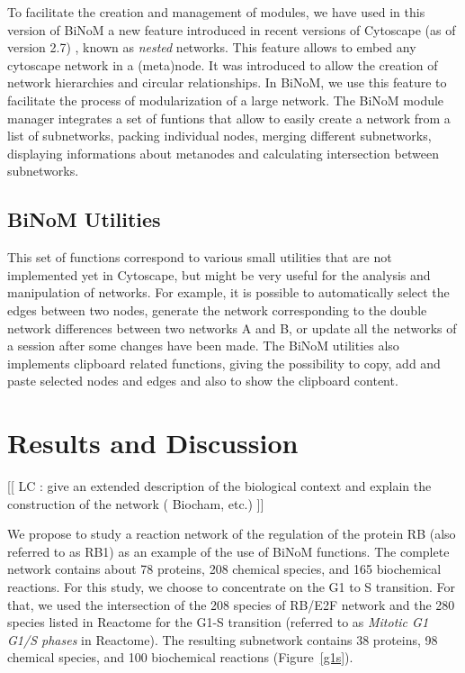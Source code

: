 \documentclass[10pt]{bmc_article}
\newenvironment{bmcformat}{\baselineskip20pt\sloppy\setboolean{publ}{false}}{\baselineskip20pt\sloppy}
\begin{document}
\begin{bmcformat}
To facilitate the creation and management of modules, we have used in this
version of BiNoM a new feature introduced in recent versions of Cytoscape (as of
version 2.7) \cite{cline2007integration}, known as \emph{nested} networks. This
feature allows to embed any cytoscape network in a (meta)node. It was
introduced to allow the creation of network hierarchies and circular
relationships. In BiNoM, we use this feature to facilitate the process of
modularization of a large network. The BiNoM module manager integrates a set of
funtions that allow to easily create a network from a list of subnetworks,
packing individual nodes, merging different subnetworks, displaying informations
about metanodes and calculating intersection between subnetworks.

\subsection*{BiNoM Utilities}
This set of functions correspond to various small utilities that are not
implemented yet in Cytoscape, but might be very useful for the analysis and
manipulation of networks. For example, it is possible to automatically select
the edges between two nodes, generate the network corresponding to the double
network differences between two networks A and B, or update all the networks of
a session after some changes have been made. The BiNoM utilities also implements
clipboard related functions, giving the possibility to copy, add and paste
selected nodes and edges and also to show the clipboard content. 


\section*{Results and Discussion}


[[ LC : give an extended description of the biological context and explain the 
construction of the network ( Biocham, etc.) ]]

We propose to study a reaction network of the regulation of the protein RB (also
referred to as RB1) \cite{calzone2008comprehensive} as an example of the use of
BiNoM functions. The complete network contains about 78 proteins, 208 chemical
species, and 165 biochemical reactions. For this study, we choose to concentrate
on the G1 to S transition. For that, we used the intersection of the 208 species
of RB/E2F network and the 280 species listed in Reactome for the G1-S transition
(referred to as \emph{Mitotic G1 G1/S phases} in Reactome). The resulting
subnetwork contains 38 proteins, 98 chemical species, and 100 biochemical
reactions (Figure~\ref{g1s}).


\end{bmcformat}
\end{document}

